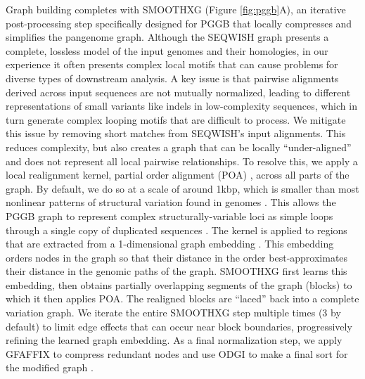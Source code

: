 \documentclass[pdflatex,mathphys]{jnl}%
\theoremstyle{thmstyleone}%
\theoremstyle{thmstyletwo}%
\theoremstyle{thmstylethree}%
\begin{document}
Graph building completes with SMOOTHXG (Figure \ref{fig:pggb}A), an iterative post-processing step specifically designed for PGGB that locally compresses and simplifies the pangenome graph.
Although the SEQWISH graph presents a complete, lossless model of the input genomes and their homologies, in our experience it often presents complex local motifs that can cause problems for diverse types of downstream analysis.
A key issue is that pairwise alignments derived across input sequences are not mutually normalized, leading to different representations of small variants like indels in low-complexity sequences, which in turn generate complex looping motifs that are difficult to process.
We mitigate this issue by removing short matches from SEQWISH's input alignments.
This reduces complexity, but also creates a graph that can be locally ``under-aligned'' and does not represent all local pairwise relationships.
To resolve this, we apply a local realignment kernel, partial order alignment (POA) \cite{Lee2002,Vaser_2017,Gao_2020}, across all parts of the graph.
By default, we do so at a scale of around 1kbp, which is smaller than most nonlinear patterns of structural variation found in genomes \cite{Liao_2023,Vollger_2023}.
This allows the PGGB graph to represent complex structurally-variable loci as simple loops through a single copy of duplicated sequences \cite{Liao_2023}.
The kernel is applied to regions that are extracted from a 1-dimensional graph embedding \cite{Guarracino_odgi_2022}.
This embedding orders nodes in the graph so that their distance in the order best-approximates their distance in the genomic paths of the graph.
SMOOTHXG first learns this embedding, then obtains partially overlapping segments of the graph (blocks) to which it then applies POA.
The realigned blocks are ``laced'' back into a complete variation graph.
We iterate the entire SMOOTHXG step multiple times (3 by default) to limit edge effects that can occur near block boundaries, progressively refining the learned graph embedding.
As a final normalization step, we apply GFAFFIX to compress redundant nodes \cite{Doerr_2023} and use ODGI to make a final sort for the modified graph \cite{Guarracino_odgi_2022}.
\end{document}
